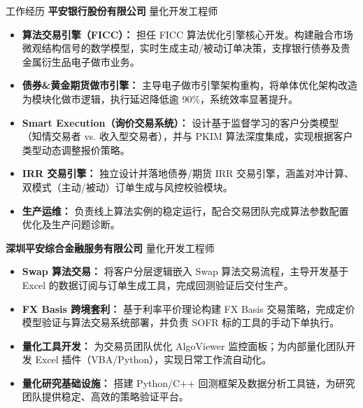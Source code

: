 \begin{rubric}{工作经历}
\entry*[2023 -- 至今]%
	\textbf{平安银行股份有限公司} \hfill 量化开发工程师%

	\begin{itemize}
		\item \textbf{算法交易引擎（FICC）：} 担任 FICC 算法优化引擎核心开发。构建融合市场微观结构信号的数学模型，实时生成主动/被动订单决策，支撑银行债券及贵金属衍生品电子做市业务。
		\item \textbf{债券\&黄金期货做市引擎：} 主导电子做市引擎架构重构，将单体优化架构改造为模块化做市逻辑，执行延迟降低逾 90\%，系统效率显著提升。
		\item \textbf{Smart Execution（询价交易系统）：} 设计基于监督学习的客户分类模型（知情交易者 vs. 收入型交易者），并与 PKIM 算法深度集成，实现根据客户类型动态调整报价策略。
		\item \textbf{IRR 交易引擎：} 独立设计并落地债券/期货 IRR 交易引擎，涵盖对冲计算、双模式（主动/被动）订单生成与风控校验模块。
		\item \textbf{生产运维：} 负责线上算法实例的稳定运行，配合交易团队完成算法参数配置优化及生产问题诊断。
	\end{itemize}%

\entry*[2021 -- 2023]%
	\textbf{深圳平安综合金融服务有限公司} \hfill 量化开发工程师%

	\begin{itemize}
		\item \textbf{Swap 算法交易：} 将客户分层逻辑嵌入 Swap 算法交易流程，主导开发基于 Excel 的数据订阅与订单生成工具，完成回测验证后交付生产。
		\item \textbf{FX Basis 跨境套利：} 基于利率平价理论构建 FX Basis 交易策略，完成定价模型验证与算法交易系统部署，并负责 SOFR 标的工具的手动下单执行。
		\item \textbf{量化工具开发：} 为交易员团队优化 AlgoViewer 监控面板；为内部量化团队开发 Excel 插件（VBA/Python），实现日常工作流自动化。
		\item \textbf{量化研究基础设施：} 搭建 Python/C++ 回测框架及数据分析工具链，为研究团队提供稳定、高效的策略验证平台。
	\end{itemize}%

\end{rubric}
